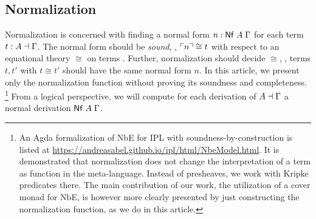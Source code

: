 \documentclass[sigplan,screen,fleqn,review]{acmart} %
\begin{document}
\subsection{Normalization}
\label{sec:normstlc}

Normalization is concerned with finding a normal form
$n : \mathsf{Nf}\;A\;\Gamma$ for each term $t : A \dashv \Gamma$.
The normal form should be \emph{sound},
\ie, $\ulcorner n\urcorner \cong t$
with respect to an equational theory $\cong$ on terms%
. %
Further, normalization should decide $\cong$, \ie,
terms $t,t'$ with $t \cong t'$ should have the same normal form $n$.
In this article, we present only the normalization function
without proving its soundness and completeness.%
\footnote{An Agda formalization of NbE for IPL with
soundness-by-construction is listed at
  \url{https://andreasabel.github.io/ipl/html/NbeModel.html}.
It is demonstrated that normalization does not change the
interpretation of a term as function in the meta-language.
Instead of presheaves, we work with Kripke predicates there.
The main contribution of our work, the utilization of a cover monad
for NbE, is however more clearly presented by just constructing the
normalization function, as we do in this article.
}
From a logical perspective, we will compute for each derivation of $A
\dashv \Gamma$ a normal derivation $\mathsf{Nf}\;A\;\Gamma$.


\end{document}
